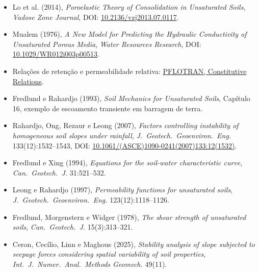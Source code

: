 \documentclass[11pt,a4paper]{article}
\numberwithin{equation}{section}
\begin{document}
\begin{itemize}
\item Lo et al. (2014), \emph{Poroelastic Theory of Consolidation in Unsaturated Soils},
\emph{Vadose Zone Journal}, DOI: \href{https://doi.org/10.2136/vzj2013.07.0117}{10.2136/vzj2013.07.0117}.
\item Mualem (1976), \emph{A New Model for Predicting the Hydraulic Conductivity of Unsaturated Porous Media},
\emph{Water Resources Research}, DOI: \href{https://doi.org/10.1029/WR012i003p00513}{10.1029/WR012i003p00513}.
\item Rela\c{c}\~oes de reten\c{c}\~ao e permeabilidade relativa:
\href{https://documentation.pflotran.org/theory_guide/constitutive_relations.html}{PFLOTRAN, Constitutive Relations}.
\item Fredlund e Rahardjo (1993), \emph{Soil Mechanics for Unsaturated Soils},
Cap\'itulo 16, exemplo de escoamento transiente em barragem de terra.
\item Rahardjo, Ong, Rezaur e Leong (2007), \emph{Factors controlling instability of homogeneous soil slopes under
rainfall}, \emph{J.\ Geotech.\ Geoenviron.\ Eng.} 133(12):1532--1543,
DOI: \href{https://doi.org/10.1061/(ASCE)1090-0241(2007)133:12(1532)}{10.1061/(ASCE)1090-0241(2007)133:12(1532)}.
\item Fredlund e Xing (1994), \emph{Equations for the soil-water characteristic curve}, \emph{Can.\ Geotech.\ J.}
31:521--532.
\item Leong e Rahardjo (1997), \emph{Permeability functions for unsaturated soils}, \emph{J.\ Geotech.\
Geoenviron.\ Eng.} 123(12):1118--1126.
\item Fredlund, Morgenstern e Widger (1978), \emph{The shear strength of unsaturated soils}, \emph{Can.\ Geotech.\
J.} 15(3):313--321.
\item Ceron, Cec\'ilio, Linn e Maghous (2025), \emph{Stability analysis of slope subjected to seepage forces
considering spatial variability of soil properties}, \emph{Int.\ J.\ Numer.\ Anal.\ Methods Geomech.} 49(11).
\end{itemize}
\end{document}
